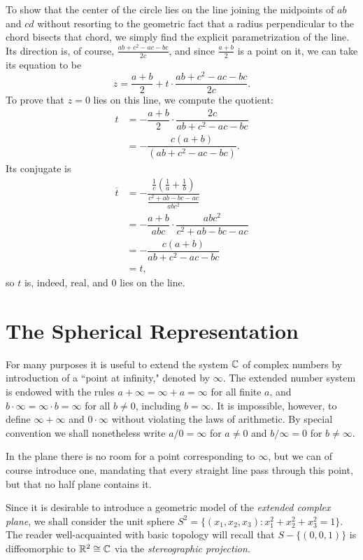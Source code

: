 \begin{exercise}
\begin{sol}
		To show that the center of the circle lies on the line joining the midpoints of $ab$ and $cd$ without resorting to the geometric fact that a radius perpendicular to the chord bisects that chord, we simply find the explicit parametrization of the line. Its direction is, of course, $\frac{ab+c^2-ac-bc}{2c}$, and since $\frac{a+b}{2}$ is a point on it, we can take its equation to be $$z=\dfrac{a+b}{2}+t \cdot \dfrac{ab+c^2-ac-bc}{2c}.$$ To prove that $z=0$ lies on this line, we compute the quotient:
		\begin{align*}
			t &=-\dfrac{a+b}{2} \cdot \dfrac{2c}{ab+c^2-ac-bc} \\
			&=-\dfrac{c(a+b)}{(ab+c^2-ac-bc)}.
		\end{align*}
		Its conjugate is
		\begin{align*}
			\overline{t} &=-\dfrac{\frac{1}{c}\left(\frac{1}{a}+\frac{1}{b}\right)}{\frac{c^2+ab-bc-ac}{abc^2}} \\
			&=-\dfrac{a+b}{abc} \cdot \dfrac{abc^2}{c^2+ab-bc-ac} \\
			&=-\dfrac{c(a+b)}{ab+c^2-ac-bc} \\
			&=t,
		\end{align*}
		so $t$ is, indeed, real, and $0$ lies on the line.
	\end{sol}
\end{exercise}

\section{The Spherical Representation}
\label{sec:riemann-sphere}
For many purposes it is useful to extend the system $\mathbb C$ of complex numbers by introduction of a ``point at infinity," denoted by $\infty$. The extended number system is endowed with the rules $a+\infty=\infty+a=\infty$ for all finite $a$, and $b \cdot \infty=\infty \cdot b=\infty$ for all $b \neq 0$, including $b=\infty$. It is impossible, however, to define $\infty+\infty$ and $0 \cdot \infty$ without violating the laws of arithmetic. By special convention we shall nonetheless write $a/0=\infty$ for $a \neq 0$ and $b/\infty=0$ for $b \neq \infty$.

In the plane there is no room for a point corresponding to $\infty$, but we can of course introduce one, mandating that every straight line pass through this point, but that no half plane contains it.

Since it is desirable to introduce a geometric model of the \textit{extended complex plane}, we shall consider the unit sphere $S^2=\{(x_1,x_2,x_3) \colon x_1^2+x_2^2+x_3^2=1\}$. The reader well-acquainted with basic topology will recall that $S-\{(0,0,1)\}$ is diffeomorphic to $\mathbb R^2 \cong \mathbb C$ via the \textit{stereographic projection}.

